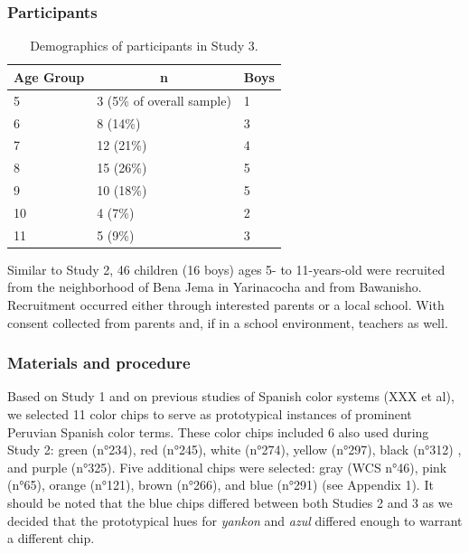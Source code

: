 \documentclass[
  english,
  ,man,floatsintext]{apa6}
\begin{document}
\hypertarget{participants-2}{%
\subsubsection{Participants}\label{participants-2}}

\begin{table}[tbp]

\begin{center}
\begin{threeparttable}

\caption{\label{tab:unnamed-chunk-6}Demographics of participants in Study 3.}

\begin{tabular}{lll}
\toprule
Age Group & \multicolumn{1}{c}{n} & \multicolumn{1}{c}{Boys}\\
\midrule
5 & 3 (5\% of overall sample) & 1\\
6 & 8 (14\%) & 3\\
7 & 12 (21\%) & 4\\
8 & 15 (26\%) & 5\\
9 & 10 (18\%) & 5\\
10 & 4 (7\%) & 2\\
11 & 5 (9\%) & 3\\
\bottomrule
\end{tabular}

\end{threeparttable}
\end{center}

\end{table}

Similar to Study 2, 46 children (16 boys) ages 5- to 11-years-old were recruited from the neighborhood of Bena Jema in Yarinacocha and from Bawanisho. Recruitment occurred either through interested parents or a local school. With consent collected from parents and, if in a school environment, teachers as well.

\hypertarget{materials-and-procedure-2}{%
\subsubsection{Materials and procedure}\label{materials-and-procedure-2}}

Based on Study 1 and on previous studies of Spanish color systems (XXX et al), we selected 11 color chips to serve as prototypical instances of prominent Peruvian Spanish color terms. These color chips included 6 also used during Study 2: green (n°234), red (n°245), white (n°274), yellow (n°297), black (n°312) , and purple (n°325). Five additional chips were selected: gray (WCS n°46), pink (n°65), orange (n°121), brown (n°266), and blue (n°291) (see Appendix 1). It should be noted that the blue chips differed between both Studies 2 and 3 as we decided that the prototypical hues for \emph{yankon} and \emph{azul} differed enough to warrant a different chip.
\end{document}
